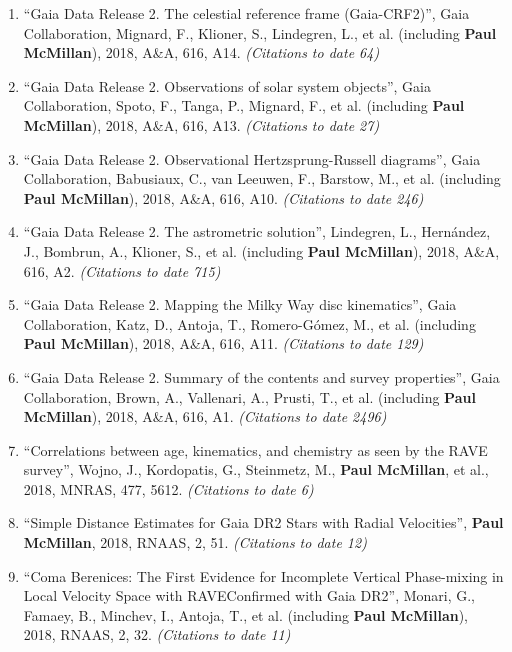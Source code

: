\documentclass{resume}
\begin{document}
\begin{enumerate}
\item ``Gaia Data Release 2. The celestial reference frame (Gaia-CRF2)'', Gaia Collaboration, Mignard, F., Klioner, S., Lindegren, L., et al. (including \textbf{Paul McMillan}), 2018, A\&A, 616, A14. \textit{(Citations to date 64)}

\item ``Gaia Data Release 2. Observations of solar system objects'', Gaia Collaboration, Spoto, F., Tanga, P., Mignard, F., et al. (including \textbf{Paul McMillan}), 2018, A\&A, 616, A13. \textit{(Citations to date 27)}

\item ``Gaia Data Release 2. Observational Hertzsprung-Russell diagrams'', Gaia Collaboration, Babusiaux, C., van Leeuwen, F., Barstow, M., et al. (including \textbf{Paul McMillan}), 2018, A\&A, 616, A10. \textit{(Citations to date 246)}

\item ``Gaia Data Release 2. The astrometric solution'', Lindegren, L., Hern\'andez, J., Bombrun, A., Klioner, S., et al. (including \textbf{Paul McMillan}), 2018, A\&A, 616, A2. \textit{(Citations to date 715)}

\item ``Gaia Data Release 2. Mapping the Milky Way disc kinematics'', Gaia Collaboration, Katz, D., Antoja, T., Romero-G\'omez, M., et al. (including \textbf{Paul McMillan}), 2018, A\&A, 616, A11. \textit{(Citations to date 129)}

\item ``Gaia Data Release 2. Summary of the contents and survey properties'', Gaia Collaboration, Brown, A., Vallenari, A., Prusti, T., et al. (including \textbf{Paul McMillan}), 2018, A\&A, 616, A1. \textit{(Citations to date 2496)}

\item ``Correlations between age, kinematics, and chemistry as seen by the RAVE survey'', Wojno, J., Kordopatis, G., Steinmetz, M., \textbf{Paul McMillan}, et al., 2018, MNRAS, 477, 5612. \textit{(Citations to date 6)}

\item ``Simple Distance Estimates for Gaia DR2 Stars with Radial Velocities'', \textbf{Paul McMillan}, 2018, RNAAS, 2, 51. \textit{(Citations to date 12)}

\item ``Coma Berenices: The First Evidence for Incomplete Vertical Phase-mixing in Local Velocity Space with RAVE{\textemdash}Confirmed with Gaia DR2'', Monari, G., Famaey, B., Minchev, I., Antoja, T., et al. (including \textbf{Paul McMillan}), 2018, RNAAS, 2, 32. \textit{(Citations to date 11)}


\end{enumerate}
\end{document}

